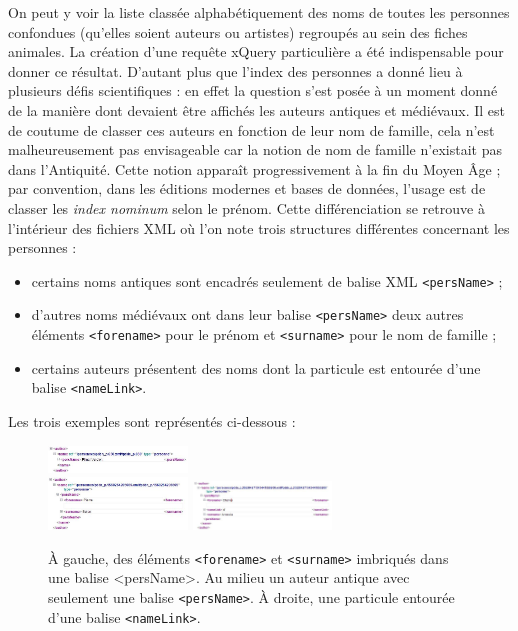 \documentclass[a4paper,12pt,twoside]{book}
\begin{document}
On peut y voir la liste classée alphabétiquement des noms de toutes les personnes confondues (qu'elles soient auteurs ou artistes) regroupés au sein des fiches animales. La création d'une requête xQuery particulière a été indispensable pour donner ce résultat. D'autant plus que l'index des personnes a donné lieu
à plusieurs défis scientifiques : en effet la question s'est posée à un moment donné de la manière dont devaient être affichés les auteurs antiques et médiévaux. Il est de coutume de classer ces auteurs en fonction de leur nom de famille, cela n'est malheureusement pas envisageable car la notion de nom de famille n'existait pas dans l'Antiquité. Cette notion apparaît progressivement à la fin du Moyen Âge ; par convention, dans les éditions modernes et bases de données, l'usage est de classer les \textit{index nominum} selon le prénom. Cette différenciation se retrouve à l'intérieur des fichiers XML où l'on note trois structures différentes concernant les personnes :
\begin{itemize}
    \item certains noms antiques sont encadrés seulement de balise XML \texttt{<persName>} ;
    \item d'autres noms médiévaux ont dans leur balise \texttt{<persName>} deux autres éléments \texttt{<forename>} pour le prénom et \texttt{<surname>} pour le nom de famille ;
    \item certains auteurs présentent des noms dont la particule est entourée d'une balise \texttt{<nameLink>}.
\end{itemize}

Les trois exemples sont représentés ci-dessous :

\begin{figure}[H]
        \centering
       
        \includegraphics[width=0.33\textwidth]{img/partie_3/auteur_PA.JPG} \\
       
        \includegraphics[width=0.33\textwidth]{img/partie_3/auteur_PB.JPG}\hfill
        \includegraphics[width=0.33\textwidth]{img/partie_3/auteur_particule.JPG}
        \caption{À gauche, des éléments \texttt{<forename>} et \texttt{<surname>} imbriqués dans une balise <persName>. Au milieu un auteur antique avec seulement une balise \texttt{<persName>}. À droite, une particule entourée d'une balise \texttt{<nameLink>}.}
        \label{fig:foobar}
    \end{figure}
\end{document}
